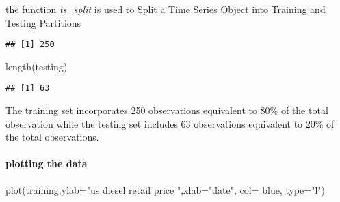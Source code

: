\documentclass[
]{article}
\newenvironment{Shaded}{\begin{snugshade}}{\end{snugshade}}
\newcommand{\AttributeTok}[1]{\textcolor[rgb]{0.77,0.63,0.00}{#1}}
\newcommand{\DecValTok}[1]{\textcolor[rgb]{0.00,0.00,0.81}{#1}}
\newcommand{\FunctionTok}[1]{\textcolor[rgb]{0.00,0.00,0.00}{#1}}
\newcommand{\NormalTok}[1]{#1}
\newcommand{\OtherTok}[1]{\textcolor[rgb]{0.56,0.35,0.01}{#1}}
\newcommand{\SpecialCharTok}[1]{\textcolor[rgb]{0.00,0.00,0.00}{#1}}
\newcommand{\StringTok}[1]{\textcolor[rgb]{0.31,0.60,0.02}{#1}}
\begin{document}
the function \emph{ts\_split} is used to Split a Time Series Object into
Training and Testing Partitions

\begin{Shaded}
\end{Shaded}

\begin{verbatim}
## [1] 250
\end{verbatim}

\begin{Shaded}
\begin{Highlighting}[]
\FunctionTok{length}\NormalTok{(testing)}
\end{Highlighting}
\end{Shaded}

\begin{verbatim}
## [1] 63
\end{verbatim}

The training set incorporates 250 observations equivalent to 80\% of the
total observation while the testing set includes 63 observations
equivalent to 20\% of the total observations.

\hypertarget{plotting-the-data}{%
\paragraph{plotting the data}\label{plotting-the-data}}

\begin{Shaded}
\begin{Highlighting}[]
\FunctionTok{plot}\NormalTok{(training,}\AttributeTok{ylab=}\StringTok{"us diesel retail price "}\NormalTok{,}\AttributeTok{xlab=}\StringTok{"date"}\NormalTok{,  }\AttributeTok{col=} \StringTok{\textquotesingle{}blue\textquotesingle{}}\NormalTok{, }\AttributeTok{type=}\StringTok{"l"}\NormalTok{)}
\end{Highlighting}
\end{Shaded}
\end{document}
